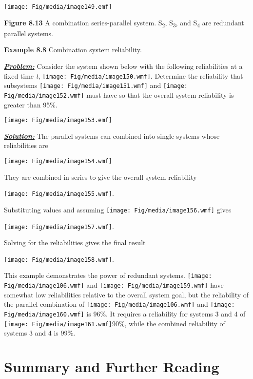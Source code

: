 \texttt{[image: Fig/media/image149.emf]}

\textbf{Figure 8.13} A combination series-parallel system.
S\textsubscript{2}, S\textsubscript{3}, and S\textsubscript{4} are
redundant parallel systems.

\textbf{Example 8.8} Combination system reliability.

\emph{\textbf{\ul{Problem:}}} Consider the system shown below with the
following reliabilities at a fixed time \emph{t},
\texttt{[image: Fig/media/image150.wmf]}. Determine the reliability that
subsystems \texttt{[image: Fig/media/image151.wmf]} and
\texttt{[image: Fig/media/image152.wmf]} must have so that the overall
system reliability is greater than 95\%.

\texttt{[image: Fig/media/image153.emf]}

\emph{\textbf{\ul{Solution:}}} The parallel systems can combined into
single systems whose reliabilities are

\texttt{[image: Fig/media/image154.wmf]}

They are combined in series to give the overall system reliability

\texttt{[image: Fig/media/image155.wmf]}.

Substituting values and assuming
\texttt{[image: Fig/media/image156.wmf]} gives

\texttt{[image: Fig/media/image157.wmf]}.

Solving for the reliabilities gives the final result

\texttt{[image: Fig/media/image158.wmf]}.

This example demonstrates the power of redundant systems.
\texttt{[image: Fig/media/image106.wmf]} and
\texttt{[image: Fig/media/image159.wmf]} have somewhat low reliabilities
relative to the overall system goal, but the reliability of the parallel
combination of \texttt{[image: Fig/media/image106.wmf]} and
\texttt{[image: Fig/media/image160.wmf]} is 96\%. It requires a
reliability for systems 3 and 4 of
\texttt{[image: Fig/media/image161.wmf]}\ul{90\%}, while the combined
reliability of systems 3 and 4 is 99\%.

\section{Summary and Further
Reading}\label{summary-and-further-reading}

